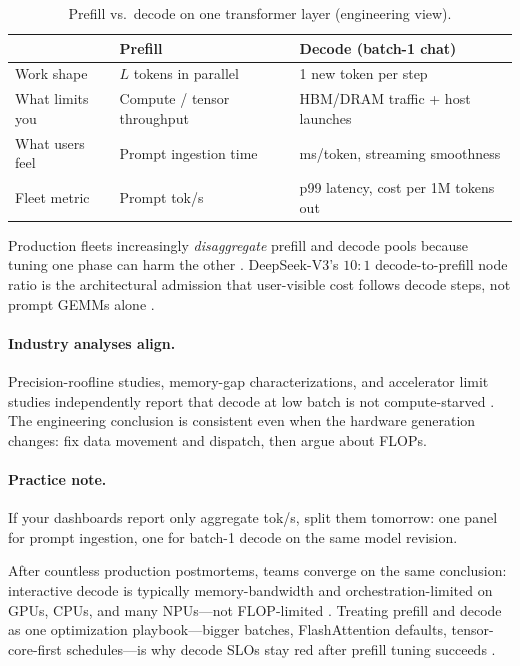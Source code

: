 \begin{table}[t]
\centering
\caption{Prefill vs.\ decode on one transformer layer (engineering view).}
\label{tab:prefill_decode}
\begin{tabular}{@{}p{1.55in}p{2.35in}p{2.35in}@{}}
\toprule
 & \textbf{Prefill} & \textbf{Decode (batch-1 chat)} \\
\midrule
Work shape & $L$ tokens in parallel & 1 new token per step \\
What limits you & Compute / tensor throughput & HBM/DRAM traffic + host launches \\
What users feel & Prompt ingestion time & ms/token, streaming smoothness \\
Fleet metric & Prompt tok/s & p99 latency, cost per 1M tokens out \\
\bottomrule
\end{tabular}
\end{table}

Production fleets increasingly \emph{disaggregate} prefill and decode pools because tuning one phase can harm the other \citep{qiao2026tellmeanefficiente,chen2026towardshighgoodput}.
DeepSeek-V3's $10{:}1$ decode-to-prefill node ratio is the architectural admission that user-visible cost follows decode steps, not prompt GEMMs alone \citep{patel2025llminference}.


\paragraph{Industry analyses align.}
Precision-roofline studies, memory-gap characterizations, and accelerator limit studies independently report that decode at low batch is not compute-starved \citep{yu2026precisionbottlenec,recasens2025mindthememorygapun,patel2025llminference}.
The engineering conclusion is consistent even when the hardware generation changes: fix data movement and dispatch, then argue about FLOPs.

\paragraph{Practice note.}
If your dashboards report only aggregate tok/s, split them tomorrow: one panel for prompt ingestion, one for batch-1 decode on the same model revision.

After countless production postmortems, teams converge on the same conclusion: interactive decode is typically memory-bandwidth and orchestration-limited on GPUs, CPUs, and many NPUs---not FLOP-limited \citep{yu2026precisionbottlenec,recasens2025mindthememorygapun,patel2025llminference}.
Treating prefill and decode as one optimization playbook---bigger batches, FlashAttention defaults, tensor-core-first schedules---is why decode SLOs stay red after prefill tuning succeeds \citep{tang2026tplatensorparallel,dao2023flashdecoding}.



